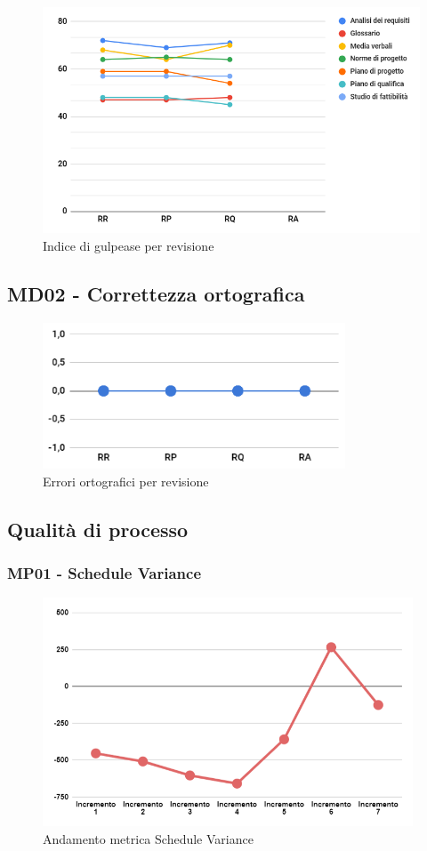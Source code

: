\begin{figure}[H]
	\centering
	\includegraphics[width=12cm]{images/gulpease.png}
	\caption{Indice di gulpease per revisione}
\end{figure}

\subsection{MD02 - Correttezza ortografica}
\begin{figure}[H]
	\centering
	\includegraphics[width=9cm]{images/err_ortografici.png}
	\caption{Errori ortografici per revisione}
\end{figure}
\newpage

\subsection{Qualità di processo}

\subsubsection{MP01 - Schedule Variance}

\begin{figure}[H]
	\centering
	\includegraphics[width=11cm]{images/schedule_variance.png}
	\caption{Andamento metrica Schedule Variance}
\end{figure}

